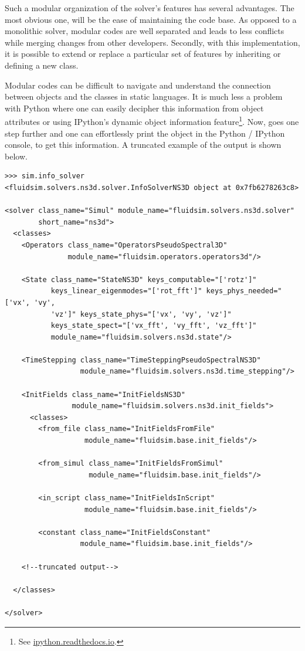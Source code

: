 \documentclass{../jors}
\begin{document}
Such a modular organization of the solver's features has several advantages.
The most obvious one, will be the ease of maintaining the code base. As opposed
to a monolithic solver, modular codes are well separated and leads to less
conflicts while merging changes from other developers. Secondly, with this
implementation, it is possible to extend or replace a particular set of
features by inheriting or defining a new class.

Modular codes can be difficult to navigate and understand the connection between
objects and the classes in static languages. It is much less a problem with
Python where one can easily decipher this information from object attributes or
using IPython's dynamic object information feature\footnote{See
\href{https://ipython.readthedocs.io/en/stable/interactive/%
reference.html\#dynamic-object-information}{ipython.readthedocs.io}.}.
%
Now,  goes one step further and one can effortlessly print the
 object in the Python / IPython console, to get this
information.  A truncated example of the output is shown below.

\begin{verbatim}
>>> sim.info_solver
<fluidsim.solvers.ns3d.solver.InfoSolverNS3D object at 0x7fb6278263c8>

<solver class_name="Simul" module_name="fluidsim.solvers.ns3d.solver"
        short_name="ns3d">
  <classes>
    <Operators class_name="OperatorsPseudoSpectral3D"
               module_name="fluidsim.operators.operators3d"/>

    <State class_name="StateNS3D" keys_computable="['rotz']"
           keys_linear_eigenmodes="['rot_fft']" keys_phys_needed="['vx', 'vy',
           'vz']" keys_state_phys="['vx', 'vy', 'vz']"
           keys_state_spect="['vx_fft', 'vy_fft', 'vz_fft']"
           module_name="fluidsim.solvers.ns3d.state"/>

    <TimeStepping class_name="TimeSteppingPseudoSpectralNS3D"
                  module_name="fluidsim.solvers.ns3d.time_stepping"/>

    <InitFields class_name="InitFieldsNS3D"
                module_name="fluidsim.solvers.ns3d.init_fields">
      <classes>
        <from_file class_name="InitFieldsFromFile"
                   module_name="fluidsim.base.init_fields"/>

        <from_simul class_name="InitFieldsFromSimul"
                    module_name="fluidsim.base.init_fields"/>

        <in_script class_name="InitFieldsInScript"
                   module_name="fluidsim.base.init_fields"/>

        <constant class_name="InitFieldsConstant"
                  module_name="fluidsim.base.init_fields"/>

	<!--truncated output-->

  </classes>

</solver>
\end{verbatim}
\end{document}
